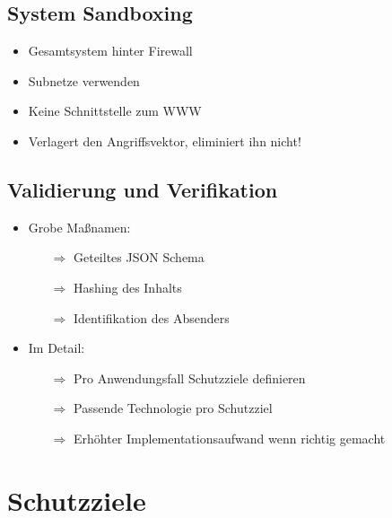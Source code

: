 \documentclass{beamer}
\begin{document}
\subsection{System Sandboxing}
\begin{frame}{\insertsubsection}
	\begin{itemize}
		\setlength\itemsep{2em}
		\item Gesamtsystem hinter Firewall
		\item Subnetze verwenden
		\item Keine Schnittstelle zum WWW
		\item Verlagert den Angriffsvektor, eliminiert ihn nicht!
	\end{itemize}
\end{frame}


\subsection{Validierung und Verifikation}
\begin{frame}{\insertsubsection}
	\begin{itemize}
		\setlength\itemsep{1em}
		\item Grobe Maßnamen:
		\begin{itemize}
			\item[$\Rightarrow$] Geteiltes JSON Schema
			\item[$\Rightarrow$] Hashing des Inhalts
			\item[$\Rightarrow$] Identifikation des Absenders
		\end{itemize}
		\item Im Detail: 
		\begin{itemize}
			\item[$\Rightarrow$] Pro Anwendungsfall Schutzziele definieren
			\item[$\Rightarrow$] Passende Technologie pro Schutzziel
			\item[$\Rightarrow$] Erhöhter Implementationsaufwand wenn richtig gemacht
		\end{itemize}
	\end{itemize}
\end{frame}

\section{Schutzziele}
\end{document}
